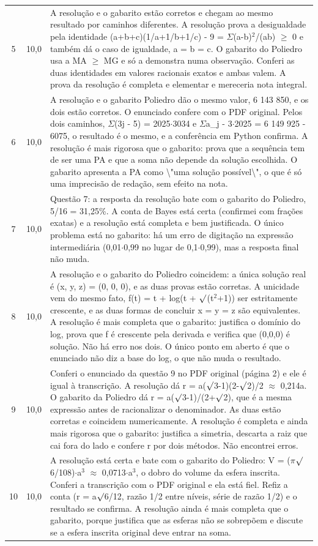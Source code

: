 \documentclass{article}%
\begin{document}
\begin{longtable}{@{}c c p{}@{}}
5 & 10,0 & A resolução e o gabarito estão corretos e chegam ao mesmo resultado por caminhos diferentes. A resolução prova a desigualdade pela identidade (a+b+c)(1/a+1/b+1/c) - 9 = $\Sigma$(a-b)$^2$/(ab) $\geq$ 0 e também dá o caso de igualdade, a = b = c. O gabarito do Poliedro usa a MA $\geq$ MG e só a demonstra numa observação. Conferi as duas identidades em valores racionais exatos e ambas valem. A prova da resolução é completa e elementar e mereceria nota integral. \\
6 & 10,0 & A resolução e o gabarito Poliedro dão o mesmo valor, 6 143 850, e os dois estão corretos. O enunciado confere com o PDF original. Pelos dois caminhos, $\Sigma$(3j - 5) = 2025$\cdot$3034 e $\Sigma$a\_j - 3$\cdot$2025 = 6 149 925 - 6075, o resultado é o mesmo, e a conferência em Python confirma. A resolução é mais rigorosa que o gabarito: prova que a sequência tem de ser uma PA e que a soma não depende da solução escolhida. O gabarito apresenta a PA como \textbackslash{}"uma solução possível\textbackslash{}", o que é só uma imprecisão de redação, sem efeito na nota. \\
7 & 10,0 & Questão 7: a resposta da resolução bate com o gabarito do Poliedro, 5/16 = 31,25\%. A conta de Bayes está certa (confirmei com frações exatas) e a resolução está completa e bem justificada. O único problema está no gabarito: há um erro de digitação na expressão intermediária (0,01$\cdot$0,99 no lugar de 0,1$\cdot$0,99), mas a resposta final não muda. \\
8 & 10,0 & A resolução e o gabarito do Poliedro coincidem: a única solução real é (x, y, z) = (0, 0, 0), e as duas provas estão corretas. A unicidade vem do mesmo fato, f(t) = t + log(t + $\surd$(t$^2$+1)) ser estritamente crescente, e as duas formas de concluir x = y = z são equivalentes. A resolução é mais completa que o gabarito: justifica o domínio do log, prova que f é crescente pela derivada e verifica que (0,0,0) é solução. Não há erro nos dois. O único ponto em aberto é que o enunciado não diz a base do log, o que não muda o resultado. \\
9 & 10,0 & Conferi o enunciado da questão 9 no PDF original (página 2) e ele é igual à transcrição. A resolução dá r = a($\surd$3-1)(2-$\surd$2)/2 $\approx$ 0,214a. O gabarito da Poliedro dá r = a($\surd$3-1)/(2+$\surd$2), que é a mesma expressão antes de racionalizar o denominador. As duas estão corretas e coincidem numericamente. A resolução é completa e ainda mais rigorosa que o gabarito: justifica a simetria, descarta a raiz que cai fora do lado e confere r por dois métodos. Não encontrei erros. \\
10 & 10,0 & A resolução está certa e bate com o gabarito do Poliedro: V = ($\pi$$\surd$6/108)$\cdot$a$^3$ $\approx$ 0,0713$\cdot$a$^3$, o dobro do volume da esfera inscrita. Conferi a transcrição com o PDF original e ela está fiel. Refiz a conta (r = a$\surd$6/12, razão 1/2 entre níveis, série de razão 1/2) e o resultado se confirma. A resolução ainda é mais completa que o gabarito, porque justifica que as esferas não se sobrepõem e discute se a esfera inscrita original deve entrar na soma. \\
\bottomrule\end{longtable}%
\end{document}
